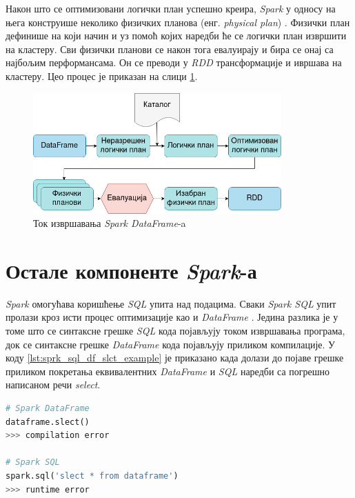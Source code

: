\documentclass[12pt,oneside]{memoir}
\begin{document}
Након што се оптимизовани логички план успешно креира, \textit{Spark} у односу на њега конструише неколико физичких планова (енг. \textit{physical plan}) \cite{spark_guide}. Физички план дефинише на који начин и уз помоћ којих наредби ће се логички план извршити на кластеру. Сви физички планови се након тога евалуирају и бира се онај са најбољим перформансама. Он се преводи у \textit{RDD} трансформације и ивршава на кластеру. Цео процес је приказан на слици \ref{fig:sprk_ex_plns}.

\begin{figure}[!ht]
  \centering
  \includegraphics[width=0.85\textwidth]{pictures/dataframe_optimization.png}
  \caption{Ток извршавања \textit{Spark DataFrame}-a}
  \label{fig:sprk_ex_plns}
\end{figure}

\section{Остале компоненте \textit{Spark}-а}
\label{sec:spark_components}

\textit{Spark} омогућава коришћење \textit{SQL} упита над подацима. Сваки \textit{Spark SQL} упит пролази кроз исти процес оптимизације као и \textit{DataFrame} \cite{spark_guide}. Једина разлика је у томе што се синтаксне грешке \textit{SQL} кода појављују током извршавања програма, док се синтаксне грешке \textit{DataFrame} кода појављују приликом компилације. У коду \ref{lst:sprk_sql_df_slct_example} је приказано када долази до појаве грешке приликом покретања еквивалентних \textit{DataFrame} и \textit{SQL} наредби са погрешно написаном речи \textit{select}.  

\begin{lstlisting}[language=Python, caption={Извршавање \textit{DataFrame} и  \textit{SQL} кодова са грешком у писању}, label={lst:sprk_sql_df_slct_example}]
# Spark DataFrame
dataframe.slect()
>>> compilation error

# Spark SQL
spark.sql('slect * from dataframe')
>>> runtime error
\end{lstlisting}
\end{document}
